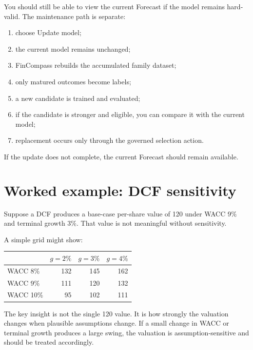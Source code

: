 \documentclass[11pt]{article}
\begin{document}
You should still be able to view the current Forecast if the model remains hard-valid. The maintenance path is separate:
\begin{enumerate}[itemsep=0.2em]
\item choose Update model;
\item the current model remains unchanged;
\item FinCompass rebuilds the accumulated family dataset;
\item only matured outcomes become labels;
\item a new candidate is trained and evaluated;
\item if the candidate is stronger and eligible, you can compare it with the current model;
\item replacement occurs only through the governed selection action.
\end{enumerate}

If the update does not complete, the current Forecast should remain available.

\section{Worked example: DCF sensitivity}
Suppose a DCF produces a base-case per-share value of 120 under WACC 9\% and terminal growth 3\%. That value is not meaningful without sensitivity.

A simple grid might show:
\begin{center}
\begin{tabular}{lrrr}\toprule
 & $g=2\%$ & $g=3\%$ & $g=4\%$\\\midrule
WACC 8\% & 132 & 145 & 162\\
WACC 9\% & 111 & 120 & 132\\
WACC 10\% & 95 & 102 & 111\\
\bottomrule\end{tabular}
\end{center}
The key insight is not the single 120 value. It is how strongly the valuation changes when plausible assumptions change. If a small change in WACC or terminal growth produces a large swing, the valuation is assumption-sensitive and should be treated accordingly.
\end{document}
